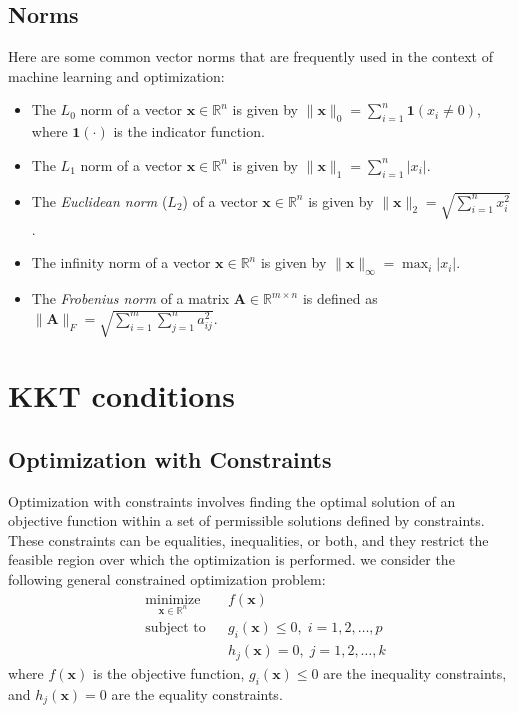 \documentclass[11pt]{book} %
\begin{document}
\subsection{Norms}
Here are some common vector norms that are frequently used in the context of machine learning and optimization:
\begin{itemize}
    \item The $L_0$ norm of a vector \(\mathbf{x} \in \mathbb{R}^n\) is given by \(\lVert \mathbf{x} \rVert_0 = \sum_{i=1}^{n} \mathbf{1}(x_i \neq 0)\), where \(\mathbf{1}(\cdot)\) is the indicator function.
    \item The $L_1$ norm of a vector \(\mathbf{x} \in \mathbb{R}^n\) is given by \(\lVert \mathbf{x} \rVert_1 = \sum_{i=1}^{n} \lvert x_i \rvert\).
    \item The \textit{Euclidean norm} ($L_2$) of a vector \(\mathbf{x} \in \mathbb{R}^n\) is given by \(\lVert \mathbf{x} \rVert_2 = \sqrt{\sum_{i=1}^{n} x_i^2}\).
    \item The infinity norm of a vector \(\mathbf{x} \in \mathbb{R}^n\) is given by \(\lVert \mathbf{x} \rVert_{\infty} = \max_{i} \lvert x_i \rvert\).
    \item The \textit{Frobenius norm} of a matrix \(\mathbf{A} \in \mathbb{R}^{m \times n}\) is defined as \(\lVert \mathbf{A} \rVert_F = \sqrt{\sum_{i=1}^{m} \sum_{j=1}^{n} a_{ij}^2}\).
\end{itemize}

%
%
%

\section{KKT conditions}
\subsection{Optimization with Constraints}

Optimization with constraints involves finding the optimal solution of an objective function within a set of permissible solutions defined by constraints. These constraints can be equalities, inequalities, or both, and they restrict the feasible region over which the optimization is performed.
we consider the following general constrained optimization problem:
\begin{equation}
\begin{aligned}
& \underset{\mathbf{x} \in \mathbb{R}^n }{\text{minimize}}
& & f(\mathbf{x}) \\
& \text{subject to}
& & g_i(\mathbf{x}) \leq 0, \; i = 1, 2, \ldots, p \\
&&& h_j(\mathbf{x}) = 0, \; j = 1, 2, \ldots, k
\end{aligned}
\end{equation}
where \(f(\mathbf{x})\) is the objective function, \(g_i(\mathbf{x}) \leq 0\) are the inequality constraints, and \(h_j(\mathbf{x}) = 0\) are the equality constraints.
\end{document}

